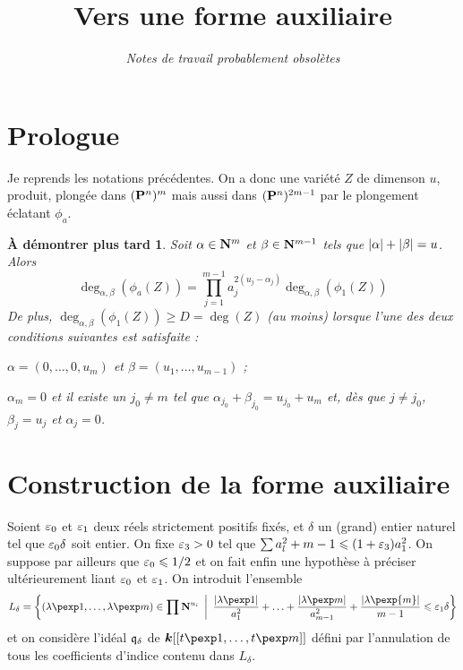 


\newtheorem{thm}{Théorème}
\newtheorem{prop}[thm]{Proposition}
\newtheorem{lem}[thm]{Lemme}
\newtheorem{coro}[thm]{Corollaire}
\newtheorem{fait}[thm]{Fait}
\newtheorem*{flemme}{À démontrer plus tard}

\theoremstyle{definition}
\newtheorem{rem}{Remarque}
\newtheorem*{Rem}{Remarque}

\title{Vers une forme auxiliaire}
\date{\itshape Notes de travail probablement obsolètes}



\maketitle

\section*{Prologue}

Je reprends les notations précédentes.  On a donc une variété $Z$ de dimenson
$u$, produit, plongée dans $(\mathbf{P}^n)^m$ mais aussi dans $(\mathbf{P}^n)^{2m-1}$ par
le plongement \og éclatant \fg{} $\phi_a$.

\begin{flemme}
  Soit $\alpha \in \mathbf{N}^m$ et $\beta \in \mathbf{N}^{m-1}$ tels que ${\lvert\alpha\rvert} +
  {\lvert\beta\rvert} = u$. Alors
  \[
    \deg_{\alpha, \beta}(\phi_a(Z))= \prod_{j=1}^{m-1} a_j^{2(u_j - \alpha_j)}
    \deg_{\alpha, \beta}(\phi_1(Z))
  \]
  De plus, $\deg_{\alpha, \beta}(\phi_1(Z)) \ge D = \deg(Z)$ (au moins) lorsque
  l'une des deux conditions suivantes est satisfaite :
  \begin{enumthm}
    \item $\alpha = (0, \ldots, 0, u_m)$ et $\beta = (u_1, \ldots, u_{m-1})$ ;
    \item $\alpha_m = 0$ et il existe un $j_0 \neq m$ tel que $\alpha_{j_0} +
      \beta_ {j_0} = u_{j_0} + u_m$ et, dès que $j \neq j_0$, $\beta_j = u_j$ et
      $\alpha_j = 0$.
  \end{enumthm}
\end{flemme}

\section{Construction de la forme auxiliaire}

Soient $\varepsilon_0$ et $\varepsilon_1$ deux réels strictement positifs fixés, et $\delta$
un (grand) entier naturel tel que $\varepsilon_0 \delta$ soit entier. On fixe $\varepsilon_3 >
0$ tel que $\sum a_l^2 + m -1 \leqslant (1 + \varepsilon_3) a_1^2$. On suppose par ailleurs
que $\varepsilon_0 \leqslant 1/2$ et on fait enfin une hypothèse à préciser ultérieurement
liant $\varepsilon_0$ et $\varepsilon_1$. On introduit l'ensemble
\[
  L_\delta = \left\{ (\lambda\pexp 1, \ldots, \lambda\pexp m) \in \prod \N^{u_i}
  \,\suchthat\,
  \frac{\lgr{\lambda\pexp1}}{a_1^2} + \ldots +
  \frac{\lgr{\lambda\pexp m}}{a_{m-1}^2} + \frac{\lgr{\lambda\pexp{m}}}{m-1}
  \le \eps_1 \delta \right\}
\]
et on considère l'idéal ${\mathfrak q}_\delta$ de $\cdn[[t\pexp1, \ldots, t\pexp m]]$
défini par l'annulation de tous les coefficients d'indice contenu dans
$L_\delta$.

